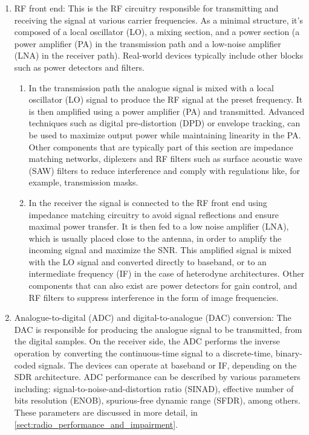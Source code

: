 \begin{enumerate}
  \item RF front end: This is the RF circuitry responsible for transmitting and receiving the signal at various carrier frequencies. As a minimal structure, it's composed of a local oscillator (LO), a mixing section, and a power section (a power amplifier (PA) in the transmission path and a low-noise amplifier (LNA) in the receiver path). Real-world devices typically include other blocks such as power detectors and filters.
  \begin{enumerate}
    \item In the transmission path the analogue signal is mixed with a local oscillator (LO) signal to produce the RF signal at the preset frequency. It is then amplified using a power amplifier (PA) and transmitted. Advanced techniques such as digital pre-distortion (DPD) or envelope tracking, can be used to maximize output power while maintaining linearity in the PA. Other components that are typically part of this section are impedance matching networks, diplexers and RF filters such as surface acoustic wave (SAW) filters to reduce interference and comply with regulations like, for example, transmission masks.
    \item In the receiver the signal is connected to the RF front end using impedance matching circuitry to avoid signal reflections and ensure maximal power transfer. It is then fed to a low noise amplifier (LNA), which is usually placed close to the antenna, in order to amplify the incoming signal and maximize the SNR. This amplified signal is mixed with the LO signal and converted directly to baseband, or to an intermediate frequency (IF) in the case of heterodyne architectures\cite{tech_radio_handbook}. Other components that can also exist are power detectors for gain control, and RF filters to suppress interference in the form of image frequencies.
  \end{enumerate}

  \item Analogue-to-digital (ADC) and digital-to-analogue (DAC) conversion: The DAC is responsible for producing the analogue signal to be transmitted, from the digital samples. On the receiver side, the ADC performs the inverse operation by converting the continuous-time signal to a discrete-time, binary-coded signals. The devices can operate at baseband or IF, depending on the SDR architecture. ADC performance can be described by various parameters \cite{adc_survey} \cite{digital_frontend_sdr} including: signal-to-noise-and-distortion ratio (SINAD), effective number of bits resolution (ENOB), spurious-free dynamic range (SFDR), among others. These parameters are discussed in more detail, in \autoref{sect:radio_performance_and_impairment}.


\end{enumerate}
